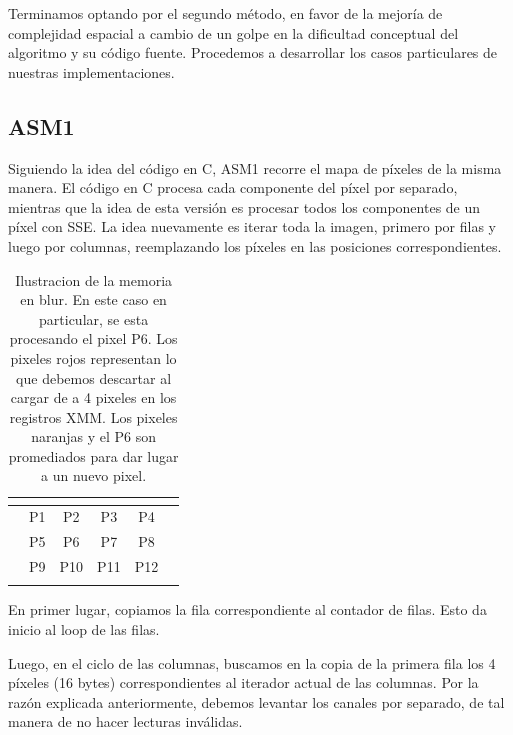 Terminamos optando por el segundo método, en favor de la mejoría de complejidad espacial a cambio de un golpe en la dificultad conceptual del algoritmo y su código fuente. Procedemos a desarrollar los casos particulares de nuestras implementaciones.

\subsection{ASM1}

Siguiendo la idea del código en C, ASM1 recorre el mapa de píxeles de la misma manera. El código en C procesa cada componente del píxel por separado, mientras que la idea de esta versión es procesar todos los componentes de un píxel con SSE. La idea nuevamente es iterar toda la imagen, primero por filas y luego por columnas, reemplazando los píxeles en las posiciones correspondientes.

\begin{table}[h]
\centering
\mem
\begin{tabular}{l|c|c|c|c|l}
 & \multicolumn{1}{l|}{}      & \multicolumn{1}{l|}{}       & \multicolumn{1}{l|}{}       & \multicolumn{1}{l|}{}       &  \\ \hline
 & \cellcolor[HTML]{FFCB2F}P1 & \cellcolor[HTML]{FFCB2F}P2  & \cellcolor[HTML]{FFCB2F}P3  & \cellcolor[HTML]{FD6864}P4  &  \\ \hline
 & \cellcolor[HTML]{FFCB2F}P5 & \cellcolor[HTML]{FFFC9E}P6  & \cellcolor[HTML]{FFCB2F}P7  & \cellcolor[HTML]{FD6864}P8  &  \\ \hline
 & \cellcolor[HTML]{FFCB2F}P9 & \cellcolor[HTML]{FFCB2F}P10 & \cellcolor[HTML]{FFCB2F}P11 & \cellcolor[HTML]{FD6864}P12 &  \\ \hline
 & \multicolumn{1}{l|}{}      & \multicolumn{1}{l|}{}       & \multicolumn{1}{l|}{}       & \multicolumn{1}{l|}{}       &
\end{tabular}
\caption{Ilustracion de la memoria en blur. En este caso en particular, se esta procesando el pixel P6. Los pixeles rojos representan lo que debemos descartar al cargar de a 4 pixeles en los registros XMM. Los pixeles naranjas y el P6 son promediados para dar lugar a un nuevo pixel.}
\end{table}

En primer lugar, copiamos la fila correspondiente al contador de filas. Esto da inicio al loop de las filas.


Luego, en el ciclo de las columnas, buscamos en la copia de la primera fila los 4 píxeles (16 bytes) correspondientes al iterador actual de las columnas.
Por la razón explicada anteriormente, debemos levantar los canales por separado, de tal manera de no hacer lecturas inválidas.

